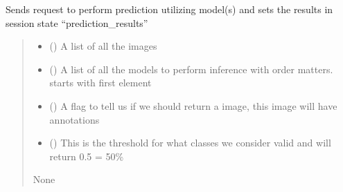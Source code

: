 \documentclass[letterpaper,10pt,english]{sphinxmanual}
\begin{document}
\begin{fulllineitems}
\label{\detokenize{modules/src.pig_sorting_streamlit.app:src.pig_sorting_streamlit.app.chain_prediction}}
\pysigstartsignatures
\pysiglinewithargsret
{}
{\sphinxparamcomma {}\sphinxparamcomma {}\sphinxparamcomma {}}
{}
\pysigstopsignatures
\sphinxAtStartPar
Sends request to perform prediction utilizing model(s) and sets the results in session state “prediction\_results”
\begin{quote}\begin{description}
\begin{itemize}
\item {} 
\sphinxAtStartPar
{} (\sphinxstyleliteralemphasis{\sphinxupquote{{[}}}\sphinxstyleliteralemphasis{\sphinxupquote{{]}}}) \textendash{} A list of all the images

\item {} 
\sphinxAtStartPar
{} (\sphinxstyleliteralemphasis{\sphinxupquote{{[}}}\sphinxstyleliteralemphasis{\sphinxupquote{{]}}}) \textendash{} A list of all the models to perform inference with order matters. starts with first element

\item {} 
\sphinxAtStartPar
{} () \textendash{} A flag to tell us if we should return a image, this image will have annotations

\item {} 
\sphinxAtStartPar
{} () \textendash{} This is the threshold for what classes we consider valid and will return 0.5 = 50\%

\end{itemize}

\sphinxAtStartPar
None

\end{description}\end{quote}

\end{fulllineitems}
\end{document}
